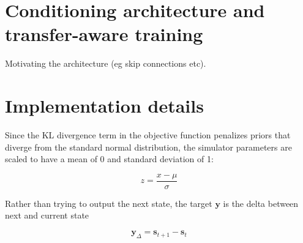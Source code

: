 \documentclass{kththesis}
\newcommand{\vy}{\boldsymbol{y}}
\newcommand{\cvae}{\textsc{cvae}}
\newcommand{\vs}{\pmb{s}_t}
\newcommand{\vns}{\pmb{s}_{t+1}}
\def\layersep{50pt}
\begin{document}

        
        

\section{Conditioning architecture and transfer-aware training}

Motivating the architecture (eg skip connections etc). 


\section{Implementation details}

Since the KL divergence term in the objective function penalizes priors that diverge from the standard normal distribution, the simulator parameters are scaled to have a mean of 0 and standard deviation of 1:

\begin{equation*}
    z = \frac{x - \mu}{\sigma}
\end{equation*}


Rather than trying to output the next state, the target $\vy$ is the delta between next and current state

\begin{equation*}
    \vy_{\Delta} = \vns - \vs
\end{equation*}


\end{document}
